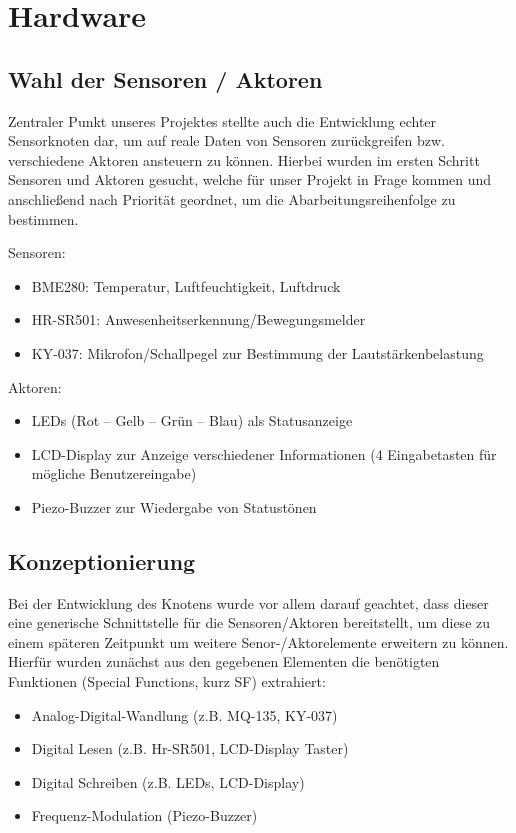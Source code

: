\section{Hardware}\label{ch:hardware}

\subsection{Wahl der Sensoren / Aktoren}

Zentraler Punkt unseres Projektes stellte auch die Entwicklung echter Sensorknoten dar, um auf reale Daten von Sensoren zurückgreifen bzw. verschiedene Aktoren ansteuern zu können. Hierbei wurden im ersten Schritt Sensoren und Aktoren gesucht, welche für unser Projekt in Frage kommen und anschließend nach Priorität geordnet, um die Abarbeitungsreihenfolge zu bestimmen.

Sensoren:
\begin{itemize}
\item BME280: Temperatur, Luftfeuchtigkeit, Luftdruck
\item HR-SR501: Anwesenheitserkennung/Bewegungsmelder
\item KY-037: Mikrofon/Schallpegel zur Bestimmung der Lautstärkenbelastung
\end{itemize}

Aktoren:
\begin{itemize}
\item LEDs (Rot – Gelb – Grün – Blau) als Statusanzeige
\item LCD-Display zur Anzeige verschiedener Informationen (4 Eingabetasten für mögliche Benutzereingabe)
\item Piezo-Buzzer zur Wiedergabe von Statustönen
\end{itemize}

\subsection{Konzeptionierung}

Bei der Entwicklung des Knotens wurde vor allem darauf geachtet, dass dieser eine generische Schnittstelle für die Sensoren/Aktoren bereitstellt, um diese zu einem späteren Zeitpunkt um weitere Senor-/Aktorelemente erweitern zu können. Hierfür wurden zunächst aus den gegebenen Elementen die benötigten Funktionen (Special Functions, kurz SF) extrahiert:

\begin{itemize}
\item Analog-Digital-Wandlung (z.B. MQ-135, KY-037)
\item Digital Lesen (z.B. Hr-SR501, LCD-Display Taster)
\item Digital Schreiben (z.B. LEDs, LCD-Display)
\item Frequenz-Modulation (Piezo-Buzzer)
\end{itemize}

